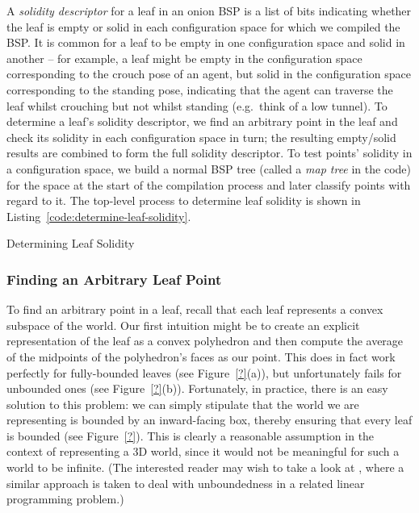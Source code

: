 \documentclass[10pt,twocolumn]{article}
\begin{document}
A \emph{solidity descriptor} for a leaf in an onion BSP is a list of bits indicating whether the leaf is empty or solid in each configuration space for which we compiled the BSP. It is common for a leaf to be empty in one configuration space and solid in another -- for example, a leaf might be empty in the configuration space corresponding to the crouch pose of an agent, but solid in the configuration space corresponding to the standing pose, indicating that the agent can traverse the leaf whilst crouching but not whilst standing (e.g.~think of a low tunnel). To determine a leaf's solidity descriptor, we find an arbitrary point in the leaf and check its solidity in each configuration space in turn; the resulting empty/solid results are combined to form the full solidity descriptor. To test points' solidity in a configuration space, we build a normal BSP tree (called a \emph{map tree} in the code) for the space at the start of the compilation process and later classify points with regard to it. The top-level process to determine leaf solidity is shown in Listing~\ref{code:determine-leaf-solidity}.

\begin{stulisting}[!t]
\caption{Determining Leaf Solidity}
\label{code:determine-leaf-solidity}

\end{stulisting}

\subsubsection{Finding an Arbitrary Leaf Point}

To find an arbitrary point in a leaf, recall that each leaf represents a convex subspace of the world. Our first intuition might be to create an explicit representation of the leaf as a convex polyhedron and then compute the average of the midpoints of the polyhedron's faces as our point. This does in fact work perfectly for fully-bounded leaves (see Figure~\ref{?}(a)), but unfortunately fails for unbounded ones (see Figure~\ref{?}(b)). Fortunately, in practice, there is an easy solution to this problem: we can simply stipulate that the world we are representing is bounded by an inward-facing box, thereby ensuring that every leaf is bounded (see Figure~\ref{?}). This is clearly a reasonable assumption in the context of representing a 3D world, since it would not be meaningful for such a world to be infinite. (The interested reader may wish to take a look at \cite{seidel91}, where a similar approach is taken to deal with unboundedness in a related linear programming problem.)
\end{document}
